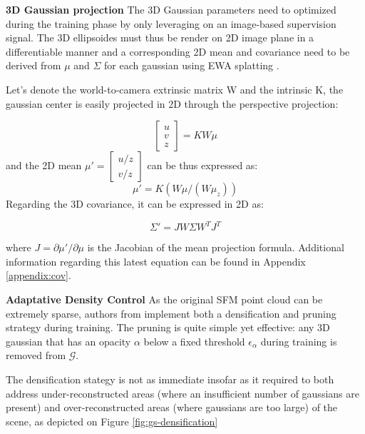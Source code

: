 \noindent \textbf{3D Gaussian projection} The 3D Gaussian parameters need to optimized during the training phase by only leveraging on an image-based supervision signal. The 3D ellipsoides must thus be render on 2D image plane in a differentiable manner and a corresponding 2D mean and covariance need to be derived from $\mu$ and $\Sigma$ for each gaussian using EWA splatting \citep{zwicker2001ewa}. 

Let's denote the world-to-camera extrinsic matrix W and the intrinsic K, the gaussian center is easily projected in 2D through the perspective projection: 

\begin{equation}
  \begin{bmatrix}
    u \\
    v \\
    z
  \end{bmatrix} = KW\mu
\end{equation}
and the 2D mean $\mu' = \begin{bmatrix}
  u/z \\
  v/z
\end{bmatrix}$ can be  thus expressed as:
\begin{equation}
  \mu' = K(W\mu/(W\mu_{z}))
\end{equation}
Regarding the 3D covariance, it can be expressed in 2D as:

\begin{equation}
  \Sigma'= JW\Sigma W^{T}J^{T}
\end{equation}

where $J = \partial \mu' / \partial \mu$ is the Jacobian of the mean projection formula. Additional information regarding this latest equation can be found in Appendix \ref{appendix:cov}. 

\noindent \textbf{Adaptative Density Control} 
As the original \ac{SFM} point cloud can be extremely sparse, authors from \cite{kerbl20233d} implement both a densification and pruning strategy during training. The pruning is quite simple yet effective: any 3D gaussian that has an opacity $\alpha$ below a fixed threshold $\epsilon_{\alpha}$ during training is removed from $\mathcal{G}$. 

The densification stategy is not as immediate insofar as it required to both address under-reconstructed areas (where an insufficient number of gaussians are present) and over-reconstructed areas (where gaussians are too large) of the scene, as depicted on Figure \ref{fig:gs-densification}

